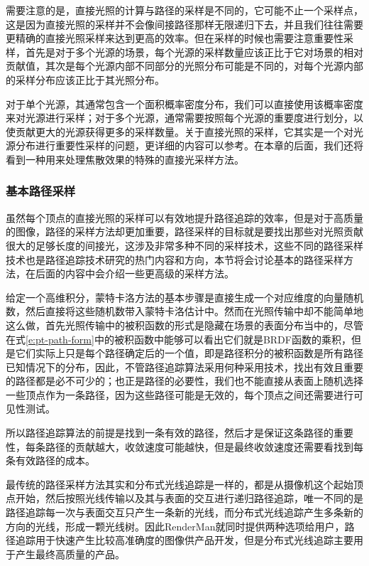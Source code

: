 需要注意的是，直接光照的计算与路径的采样是不同的，它可能不止一个采样点，这是因为直接光照的采样并不会像间接路径那样无限递归下去，并且我们往往需要更精确的直接光照采样来达到更高的效率。但在采样的时候也需要注意重要性采样，首先是对于多个光源的场景，每个光源的采样数量应该正比于它对场景的相对贡献值，其次是每个光源内部不同部分的光照分布可能是不同的，对每个光源内部的采样分布应该正比于其光照分布。

对于单个光源，其通常包含一个面积概率密度分布，我们可以直接使用该概率密度来对光源进行采样；对于多个光源，通常需要按照每个光源的重要度进行划分，以使贡献更大的光源获得更多的采样数量。关于直接光照的采样，它其实是一个对光源分布进行重要性采样的问题，更详细的内容可以参考\cite{b:AdvancedGlobalIllumination}。在本章的后面，我们还将看到一种用来处理焦散效果的特殊的直接光采样方法。






\subsubsection{基本路径采样}
虽然每个顶点的直接光照的采样可以有效地提升路径追踪的效率，但是对于高质量的图像，路径的采样方法却更加重要，路径采样的目标就是要找出那些对光照贡献很大的足够长度的间接光，这涉及非常多种不同的采样技术，这些不同的路径采样技术也是路径追踪技术研究的热门内容和方向，本节将会讨论基本的路径采样方法，在后面的内容中会介绍一些更高级的采样方法。

给定一个高维积分，蒙特卡洛方法的基本步骤是直接生成一个对应维度的向量随机数，然后直接将这些随机数带入蒙特卡洛估计中。然而在光照传输中却不能简单地这么做，首先光照传输中的被积函数的形式是隐藏在场景的表面分布当中的，尽管在式\ref{e:pt-path-form}中的被积函数中能够可以看出它们就是BRDF函数的乘积，但是它们实际上只是每个路径确定后的一个值，即是路径积分的被积函数是所有路径已知情况下的分布，因此，不管路径追踪算法采用何种采用技术，找出有效且重要的路径都是必不可少的；也正是路径的必要性，我们也不能直接从表面上随机选择一些顶点作为一条路径，因为这些路径可能是无效的，每个顶点之间还需要进行可见性测试。

所以路径追踪算法的前提是找到一条有效的路径，然后才是保证这条路径的重要性，每条路径的贡献越大，收敛速度可能越快，但是最终收敛速度还需要看找到每条有效路径的成本。

最传统的路径采样方法其实和分布式光线追踪是一样的，都是从摄像机这个起始顶点开始，然后按照光线传输以及其与表面的交互进行递归路径追踪，唯一不同的是路径追踪每一次与表面交互只产生一条新的光线，而分布式光线追踪产生多条新的方向的光线，形成一颗光线树。因此RenderMan就同时提供两种选项给用户，路径追踪用于快速产生比较高准确度的图像供产品开发，但是分布式光线追踪主要用于产生最终高质量的产品。

